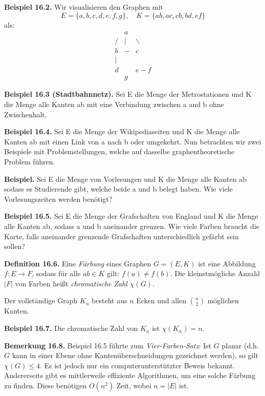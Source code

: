 \documentclass[9pt]{article}
\begin{document}
\textbf{Beispiel 16.2.}  
Wir visualisieren den Graphen mit  
\[
E = \{a, b, c, d, e, f, g\}, \quad K = \{ab, ac, cb, bd, ef\}
\]
als:
\[
\begin{array}{ccc}
  & a & \\
 / & | & \backslash \\
b  & - & c \\
 | & & \\
d & & e - f \\
  & g & 
\end{array}
\]

\textbf{Beispiel 16.3 (Stadtbahnnetz).}  
Sei E die Menge der Metrostationen und
K die Menge alle Kanten ab mit eine Verbindung zwischen a and b ohne
Zwischenhalt.

\textbf{Beispiel 16.4.}  
Sei E die Menge der Wikipediaseiten und K die Menge alle
Kanten ab mit einen Link von a nach b oder umgekehrt.
Nun betrachten wir zwei Beispiele mit Problemstellungen, welche auf
dasselbe graphentheoretische Problem führen.

\textbf{Beispiel.}  
Sei E die Menge von Vorlesungen und K die Menge alle Kanten
ab sodass es Studierende gibt, welche beide a und b belegt haben. Wie viele
Vorlesungszeiten werden benötigt?

\textbf{Beispiel 16.5.}  
Sei E die Menge der Grafschaften von England und K die
Menge alle Kanten ab, sodass a und b aneinander grenzen. Wie viele Farben
braucht die Karte, falls aneinander grenzende Grafschaften unterschiedlich
gefärbt sein sollen? 

\textbf{Definition 16.6.}  
Eine \textit{Färbung} eines Graphen \( G = (E, K) \) ist eine Abbildung \( f : E \to F \), sodass für alle \( ab \in K \) gilt: \( f(a) \neq f(b) \).  
Die kleinstmögliche Anzahl \( |F| \) von Farben heißt \textit{chromatische Zahl} \( \chi(G) \).

Der vollständige Graph \( K_n \) besteht aus \( n \) Ecken und allen \( \binom{n}{2} \) möglichen Kanten.

\textbf{Beispiel 16.7.}  
Die chromatische Zahl von \( K_n \) ist \( \chi(K_n) = n \).

\textbf{Bemerkung 16.8.}  
Beispiel 16.5 führte zum \textit{Vier-Farben-Satz}: Ist \( G \) planar (d.h. \( G \) kann in einer Ebene ohne Kantenüberschneidungen gezeichnet werden), so gilt \( \chi(G) \leq 4 \). Es ist jedoch nur ein computerunterstützter Beweis bekannt.  
Andererseits gibt es mittlerweile effiziente Algorithmen, um eine solche Färbung zu finden. Diese benötigen \( O(n^2) \) Zeit, wobei \( n = |E| \) ist.
\end{document}
